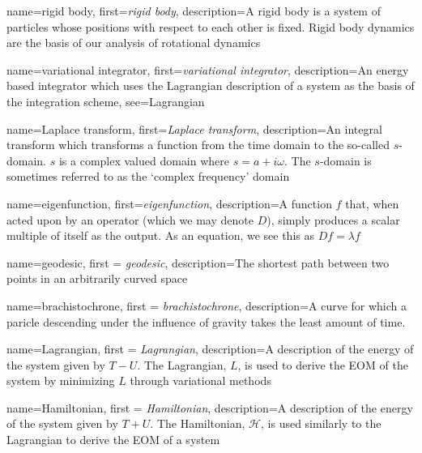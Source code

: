 {
    name=rigid body,
    first=\textit{rigid body},
    description={A rigid body is a system of particles whose positions with respect to each other is fixed. Rigid body dynamics are the basis of our analysis of rotational dynamics}
}

{
    name=variational integrator,
    first=\textit{variational integrator},
    description={An energy based integrator which uses the Lagrangian description of a system as the basis of the integration scheme},
    see={Lagrangian}
}

{
    name=Laplace transform,
    first=\textit{Laplace transform},
    description={An integral transform which transforms a function from the time domain to the so-called $s$-domain. $s$ is a complex valued domain where $s=a+i\omega$. The $s$-domain is sometimes referred to as the `complex frequency' domain}
}

{
    name=eigenfunction,
    first=\textit{eigenfunction},
    description={A function $f$ that, when acted upon by an operator (which we may denote $D$), simply produces a scalar multiple of itself as the output. As an equation, we see this as $Df=\lambda f$}
}

{
    name=geodesic,
    first = {\textit{geodesic}},
    description={The shortest path between two points in an arbitrarily curved space}
}

{
    name=brachistochrone,
    first = {\textit{brachistochrone}},
    description={A curve for which a paricle descending under the influence of gravity takes the least amount of time.}
}

{
    name=Lagrangian,
    first = {\textit{Lagrangian}},
    description={A description of the energy of the system given by $T-U$. The Lagrangian, $L$, is used to derive the EOM of the system by minimizing $L$ through variational methods}
}

{
    name=Hamiltonian,
    first = {\textit{Hamiltonian}},
    description={A description of the energy of the system given by $T+U$. The \gls{Hamiltonian}, $\mathcal{H}$, is used similarly to the Lagrangian to derive the EOM of a system}
}

